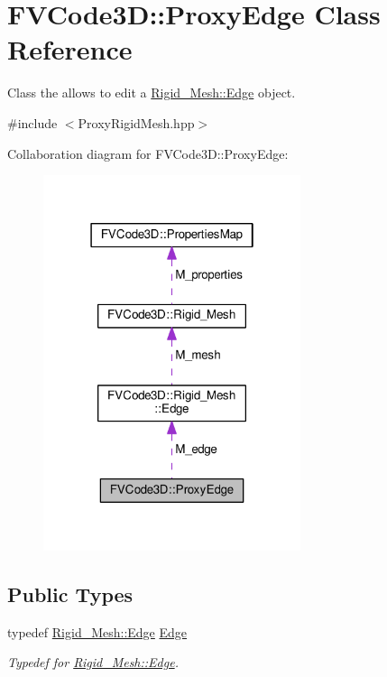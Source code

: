 \hypertarget{classFVCode3D_1_1ProxyEdge}{}\section{F\+V\+Code3D\+:\+:Proxy\+Edge Class Reference}
\label{classFVCode3D_1_1ProxyEdge}


Class the allows to edit a \hyperlink{classFVCode3D_1_1Rigid__Mesh_1_1Edge}{Rigid\+\_\+\+Mesh\+::\+Edge} object.  




{\ttfamily \#include $<$Proxy\+Rigid\+Mesh.\+hpp$>$}



Collaboration diagram for F\+V\+Code3D\+:\+:Proxy\+Edge\+:
\nopagebreak
\begin{figure}[H]
\begin{center}
\leavevmode
\includegraphics[width=214pt]{classFVCode3D_1_1ProxyEdge__coll__graph}
\end{center}
\end{figure}
\subsection*{Public Types}
\begin{DoxyCompactItemize}
\item 
typedef \hyperlink{classFVCode3D_1_1Rigid__Mesh_1_1Edge}{Rigid\+\_\+\+Mesh\+::\+Edge} \hyperlink{classFVCode3D_1_1ProxyEdge_ac30f33bd4416fe360398021fe1425e80}{Edge}
\begin{DoxyCompactList}\small\item\em Typedef for \hyperlink{classFVCode3D_1_1Rigid__Mesh_1_1Edge}{Rigid\+\_\+\+Mesh\+::\+Edge}. \end{DoxyCompactList}\end{DoxyCompactItemize}
